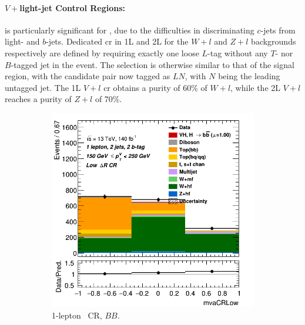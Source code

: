 \paragraph{$V +$light-jet Control Regions:} is particularly significant for \vhc, due to the difficulties in discriminating $c$-jets from light- and $b$-jets. Dedicated \gls{cr} in 1L and 2L for the $W+l$ and $Z+l$ backgrounds respectively are defined by requiring exactly one loose $L$-tag without any $T$- nor $B$-tagged jet in the event. The selection is otherwise similar to that of the signal region, with the candidate pair now tagged as $LN$, with $N$ being the leading untagged jet. The 1L $V+l$ \gls{cr} obtains a purity of 60\% of $W+l$, while the 2L $V+l$ reaches a purity of $Z+l$ of 70\%.

\begin{figure}[h!]
  \centering
  \begin{subfigure}[b]{0.32\textwidth}
      \centering
      \includegraphics[width=\textwidth]{Images/VH/Own_fit/prefit_VHbb/Region_distmvaCRLow_BMax250_BMin150_DCRLow_J2_TTypebb_T2_L1_Y6051_Prefit.png}
      \caption{1-lepton \lowdr\ CR, $BB$.}
      \label{fig:plots_VHb_ex_1L_CRL}
  \end{subfigure}
  \begin{subfigure}[b]{0.32\textwidth}
      \centering

\end{subfigure}
\end{figure}
